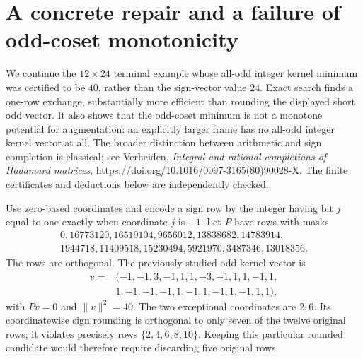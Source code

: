 \section{A concrete repair and a failure of odd-coset monotonicity}
\label{sec:odd-coset-repair}

We continue the $12\times24$ terminal example whose all-odd integer
kernel minimum was certified to be $40$, rather than the sign-vector
value $24$. Exact search finds a one-row exchange, substantially more
efficient than rounding the displayed short odd vector. It also shows
that the odd-coset minimum is not a monotone potential for augmentation:
an explicitly larger frame has no all-odd integer kernel vector at all.
The broader distinction between arithmetic and sign completion is
classical; see Verheiden, \emph{Integral and rational completions of
Hadamard matrices},
\url{https://doi.org/10.1016/0097-3165(80)90028-X}.
The finite certificates and deductions below are independently checked.

Use zero-based coordinates and encode a sign row by the integer having
bit $j$ equal to one exactly when coordinate $j$ is $-1$. Let $P$
have rows with masks
\[
\begin{gathered}
0,16773120,16519104,9656012,13838682,14783914,\\
1944718,11409518,15230494,5921970,3487346,13018356.
\end{gathered}
\]
The rows are orthogonal. The previously studied odd kernel vector is
\[
\begin{split}
v={}&(-1,-1,3,-1,1,1,-3,-1,1,1,-1,1,\\
&1,-1,-1,-1,1,-1,1,-1,1,-1,1,1),
\end{split}
\]
with $Pv=0$ and $\|v\|^2=40$. The two exceptional coordinates are
$2,6$. Its coordinatewise sign rounding is orthogonal to only seven
of the twelve original rows; it violates precisely rows
$\{2,4,6,8,10\}$. Keeping this particular rounded candidate would
therefore require discarding five original rows.

